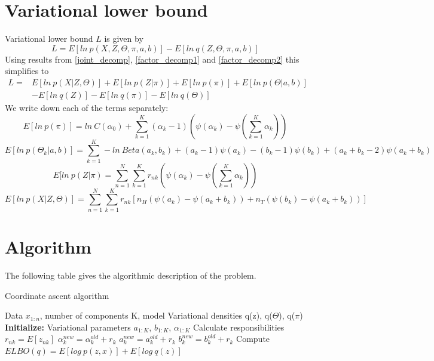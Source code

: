 \documentclass{article}
\newcommand\JointProb{p(X,Z,\Theta,\pi,a,b)}
\newcommand\Factorized{q(Z,\Theta,\pi,a,b)}
\newcommand\SumK{\sum_{k=1}^{K}}
\newcommand\SumN{\sum_{n=1}^{N}}
\begin{document}
\section{Variational lower bound}
Variational lower bound $L$ is given by 
\begin{equation}
    L = E[ln\:\JointProb{}] - E[ln\:\Factorized{}]
\end{equation}
Using results from \ref{joint_decomp}, \ref{factor_decomp1} and \ref{factor_decomp2}
this simplifies to
\begin{equation}
\begin{split}
    L =& E[ln\:p(X|Z,\Theta)] + E[ln\:p(Z|\pi)] + E[ln\:p(\pi)] + E[ln\:p(\Theta|a,b)] \\
    & -E[ln\:q(Z)] - E[ln\:q(\pi)] - E[ln\:q(\Theta)]
\end{split}        
\end{equation}
We write down each of the terms separately:
\begin{equation}
    E[ln\:p(\pi)] = ln\:C(\alpha_0)+\SumK (\alpha_k-1)(\psi(\alpha_k)-\psi(\SumK \alpha_k))
\end{equation}
\begin{equation}
    E[ln\:p(\Theta_k|a,b)]=\SumK -ln\:Beta(a_k,b_k)+(a_k-1)\psi(a_k)-(b_k-1)\psi(b_k)+(a_k+b_k-2)\psi(a_k+b_k)
\end{equation}
\begin{equation}
    E[ln\:p(Z|\pi) = \SumN\SumK r_{nk}(\psi(\alpha_k)-\psi(\SumK \alpha_k))
\end{equation}
\begin{equation}
    E[ln\:p(X|Z,\Theta)] = \SumN\SumK r_{nk}[n_H(\psi(a_k)-\psi(a_k+b_k))+n_T(\psi(b_k)-\psi(a_k+b_k))]
\end{equation}
\section{Algorithm}
The following table gives the algorithmic description of the problem.
\begin{algorithm}
\caption{Coordinate ascent algorithm}
\begin{algorithmic}
\REQUIRE Data $x_{1:n}$, number of components K, model
\ENSURE Variational densities q(z), q($\Theta$), q($\pi$)
\STATE \textbf{Initialize:} Variational parameters $a_{1:K}$, $b_{1:K}$, $\alpha_{1:K}$
\REPEAT
\STATE Calculate responsibilities $r_{nk} = E[z_{nk}]$
\STATE $\alpha_k^{new} = \alpha_k^{old} + r_k$
\STATE $a_k^{new} = a_k^{old} + r_k$
\STATE $b_k^{new} = b_k^{old} + r_k$
\ENDFOR
\STATE Compute $ELBO(q) = E[log\:p(z,x)]+E[log\:q(z)]$
\end{algorithmic}
\end{algorithm}
\end{document}
